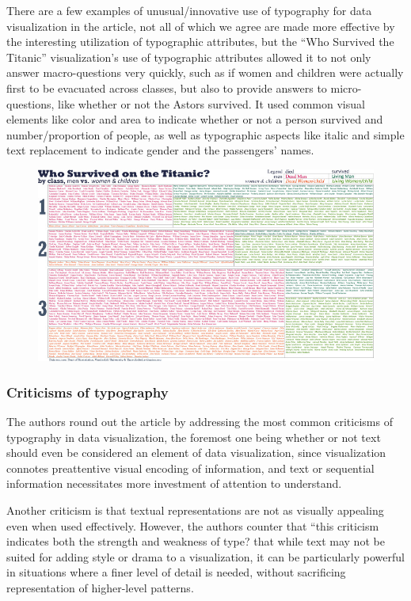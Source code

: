 \documentclass[]{book}
\begin{document}
There are a few examples of unusual/innovative use of typography for
data visualization in the article, not all of which we agree are made
more effective by the interesting utilization of typographic attributes,
but the ``Who Survived the Titanic'' visualization's use of typographic
attributes allowed it to not only answer macro-questions very quickly,
such as if women and children were actually first to be evacuated across
classes, but also to provide answers to micro-questions, like whether or
not the Astors survived. It used common visual elements like color and
area to indicate whether or not a person survived and number/proportion
of people, as well as typographic aspects like italic and simple text
replacement to indicate gender and the passengers' names.

\begin{figure}
\centering
\includegraphics{images/TypographicTitanic.jpg}
\caption{}
\end{figure}

\subsubsection{Criticisms of typography}\label{criticisms-of-typography}

The authors round out the article by addressing the most common
criticisms of typography in data visualization, the foremost one being
whether or not text should even be considered an element of data
visualization, since visualization connotes preattentive visual encoding
of information, and text or sequential information necessitates more
investment of attention to understand.

Another criticism is that textual representations are not as visually
appealing even when used effectively. However, the authors counter that
``this criticism indicates both the strength and weakness of type? that
while text may not be suited for adding style or drama to a
visualization, it can be particularly powerful in situations where a
finer level of detail is needed, without sacrificing representation of
higher-level patterns.
\end{document}
